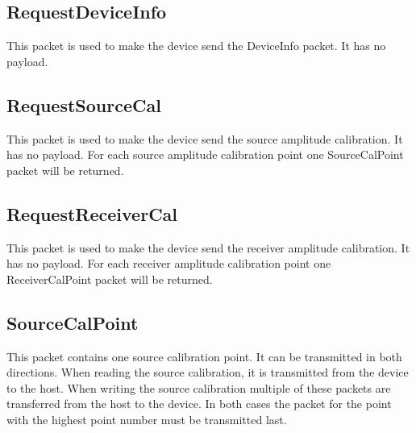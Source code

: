 \documentclass[a4paper,11pt]{article}
\begin{document}
\subsection{RequestDeviceInfo}
This packet is used to make the device send the DeviceInfo packet. It has no payload.

\subsection{RequestSourceCal}
This packet is used to make the device send the source amplitude calibration. It has no payload. For each source amplitude calibration point one SourceCalPoint packet will be returned.

\subsection{RequestReceiverCal}
This packet is used to make the device send the receiver amplitude calibration. It has no payload. For each receiver amplitude calibration point one ReceiverCalPoint packet will be returned.

\subsection{SourceCalPoint}
This packet contains one source calibration point. It can be transmitted in both directions. When reading the source calibration, it is transmitted from the device to the host. When writing the source calibration multiple of these packets are transferred from the host to the device. In both cases the packet for the point with the highest point number must be transmitted last.
\end{document}
